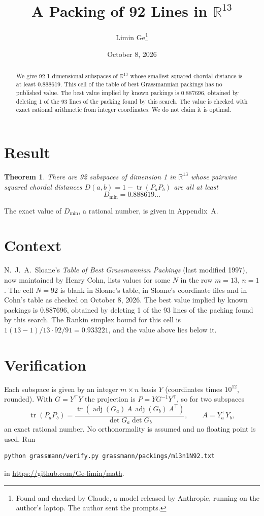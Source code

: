 \documentclass[11pt,a4paper]{article}
\title{A Packing of 92 Lines in $\mathbb{R}^{13}$}
\author{Limin Ge\thanks{Found and checked by Claude, a model released by Anthropic, running on the author's laptop. The author sent the prompts.}}
\date{October 8, 2026}
\newtheorem*{theorem}{Theorem}
\begin{document}
\maketitle
\begin{abstract}
We give 92 1-dimensional subspaces of $\mathbb{R}^{13}$ whose smallest squared chordal distance is at least 0.888619. This cell of the table of best Grassmannian packings has no published value. The best value implied by known packings is 0.887696, obtained by deleting 1 of the 93 lines of the packing found by this search. The value is checked with exact rational arithmetic from integer coordinates. We do not claim it is optimal.
\end{abstract}

\section{Result}
\begin{theorem}
There are 92 subspaces of dimension 1 in $\mathbb{R}^{13}$ whose pairwise squared chordal distances $D(a,b) = 1 - \operatorname{tr}(P_aP_b)$ are all at least
\[ D_{\min} = 0.888619\ldots \]
\end{theorem}
The exact value of $D_{\min}$, a rational number, is given in Appendix~A.


\section{Context}
N.~J.~A.~Sloane's \emph{Table of Best Grassmannian Packings} (last modified 1997), now maintained by Henry Cohn, lists values for some $N$ in the row $m=13$, $n=1$. The cell $N=92$ is blank in Sloane's table, in Sloane's coordinate files and in Cohn's table as checked on October 8, 2026. The best value implied by known packings is 0.887696, obtained by deleting 1 of the 93 lines of the packing found by this search. The Rankin simplex bound for this cell is $1(13-1)/13\cdot 92/91 = 0.933221$, and the value above lies below it.


\section{Verification}
Each subspace is given by an integer $m\times n$ basis $Y$ (coordinates times $10^{12}$, rounded). With $G=Y^\top Y$ the projection is $P=YG^{-1}Y^\top$, so for two subspaces
\[ \operatorname{tr}(P_aP_b)=\frac{\operatorname{tr}(\operatorname{adj}(G_a)\,A\,\operatorname{adj}(G_b)\,A^\top)}{\det G_a\det G_b},\qquad A=Y_a^\top Y_b, \]
an exact rational number. No orthonormality is assumed and no floating point is used. Run
\begin{verbatim}
python grassmann/verify.py grassmann/packings/m13n1N92.txt
\end{verbatim}
in \url{https://github.com/Ge-limin/math}.
\end{document}
